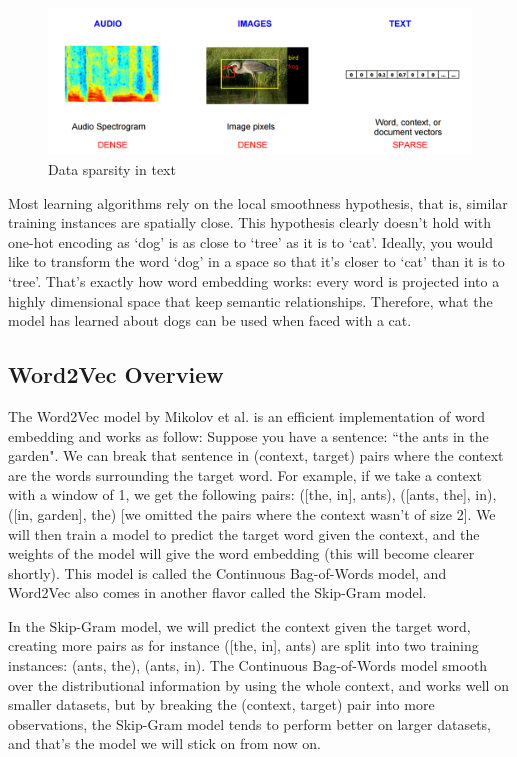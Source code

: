 \begin{figure}[H]
    \centering
    \includegraphics[width=\textwidth]{Images/comparison-text.png}
    \caption{Data sparsity in text \cite{comparison-text}}
    \label{comparison-text}
\end{figure}

Most learning algorithms rely on the local smoothness hypothesis, that is, similar training instances are spatially close. This hypothesis clearly doesn't hold with one-hot encoding as `dog' is as close to `tree' as it is to `cat'. Ideally, you would like to transform the word `dog' in a space so that it's closer to `cat' than it is to `tree'. That's exactly how word embedding works: every word is projected into a highly dimensional space that keep semantic relationships. Therefore, what the model has learned about dogs can be used when faced with a cat.

\subsection{Word2Vec Overview}
The Word2Vec model by Mikolov et al. \cite{word2vec} is an efficient implementation of word embedding and works as follow:
Suppose you have a sentence: ``the ants in the garden". We can break that sentence in (context, target) pairs where the context are the words surrounding the target word. For example, if we take a context with a window of 1, we get the following pairs: ([the, in], ants), ([ants, the], in), ([in, garden], the) [we omitted the pairs where the context wasn't of size 2]. We will then train a model to predict the target word given the context, and the weights of the model will give the word embedding (this will become clearer shortly). This model is called the Continuous Bag-of-Words model, and Word2Vec also comes in another flavor called the Skip-Gram model.

In the Skip-Gram model, we will predict the context given the target word, creating more pairs as for instance ([the, in], ants) are split into two training instances: (ants, the), (ants, in). The Continuous Bag-of-Words model smooth over the distributional information by using the whole context, and works well on smaller datasets, but by breaking the (context, target) pair into more observations, the Skip-Gram model tends to perform better on larger datasets, and that's the model we will stick on from now on.

